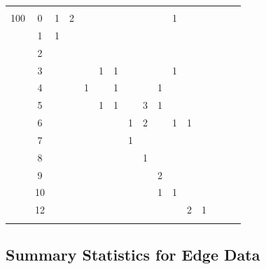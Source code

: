 \documentclass[12pt,oneside]{report}
\theoremstyle{definition}
\theoremstyle{mystyle}
\begin{document}
\begin{center}
\begin{longtable}[h!]{c c c c c c c c c c c c c c c c}
		&      &  &&&&&&&&&&&&   &   \\
		100 & 0     &1  &2&&&&&&&1&&&& &     \\
		& 1     & 1 &&&&&&&&&&&&  &    \\
		& 2&  &&&&&&&&&&&&  &    \\
		& 3     &  &&&1&1&&&&1&&&&   &   \\
		& 4     &  &&1&&1&&&1&&&&&  &    \\
		& 5     &  &&&1&1&&3&1&&&&&      \\
		& 6     &  &&&&&1&2&&1&1&&&      \\
		& 7     &  &&&&&1&&&&&&&      \\
		& 8     &  &&&&&&1&&&&&&      \\
		& 9     &  &&&&&&&2&&&&&      \\
		& 10     &  &&&&&&&1&1&&&&      \\
		& 12     &  &&&&&&&&&2&1&&      \\
		&      &  &&&&&&&&&&&&   &   \\
		
		\hline
		
	\end{longtable}
	\label{tab:edge}
\end{center}


\vspace{5mm}
\subsection{Summary Statistics for Edge Data}
\end{document}
